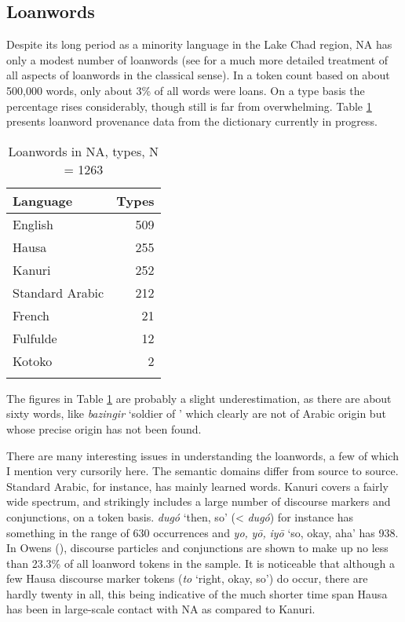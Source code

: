 \documentclass[output=paper]{langsci/langscibook}
\begin{document}
\subsection{Loanwords}\label{loans}

Despite its long period as a minority language in the Lake Chad region, NA has only a modest number of loanwords (see \citealt{Owens2000article} for a much more detailed treatment of all aspects of loanwords in the classical sense). In a token count based on about 500,000 words, only about 3\% of all words were loans. On a type basis the percentage rises considerably, though still is far from overwhelming. Table \ref{tab:nigeria:1} presents loanword provenance data from the dictionary currently in progress.

\begin{table}
\begin{tabularx}{.5\textwidth}{Xr}
\lsptoprule
Language & Types\\
\midrule
English & 509 \\
Hausa & 255 \\ 
Kanuri & 252\\
Standard Arabic & 212\\
French & 21 \\
Fulfulde & 12 \\
Kotoko & 2 \\
\lspbottomrule
\end{tabularx}
\caption{Loanwords in NA, types, N = 1263}
\label{tab:nigeria:1}
\end{table}

The figures in Table \ref{tab:nigeria:1} are probably a slight underestimation, as there are about sixty words, like \textit{bazingir} ‘soldier of ’ which clearly are not of Arabic origin but whose precise origin has not been found.

There are many interesting issues in understanding the loanwords, a few of which I mention very cursorily here. The semantic domains differ from source to source. Standard Arabic, for instance, has mainly learned words. Kanuri covers a fairly wide spectrum, and strikingly includes a large number of discourse markers and conjunctions, on a token basis. \textit{dugó} ‘then, so’ (< \textit{dugó}) for instance has something in the range of 630 occurrences and \textit{yo,} \textit{yō,} \textit{iyō} ‘so, okay, aha’ has 938. In Owens (\citeyear[303]{Owens2000article}), discourse particles and conjunctions are shown to make up no less than 23.3\% of all loanword tokens in the sample. It is noticeable that although a few Hausa discourse marker tokens (\textit{to} ‘right, okay, so’) do occur, there are hardly twenty in all, this being indicative of the much shorter time span Hausa has been in large-scale contact with NA as compared to Kanuri.
\end{document}

